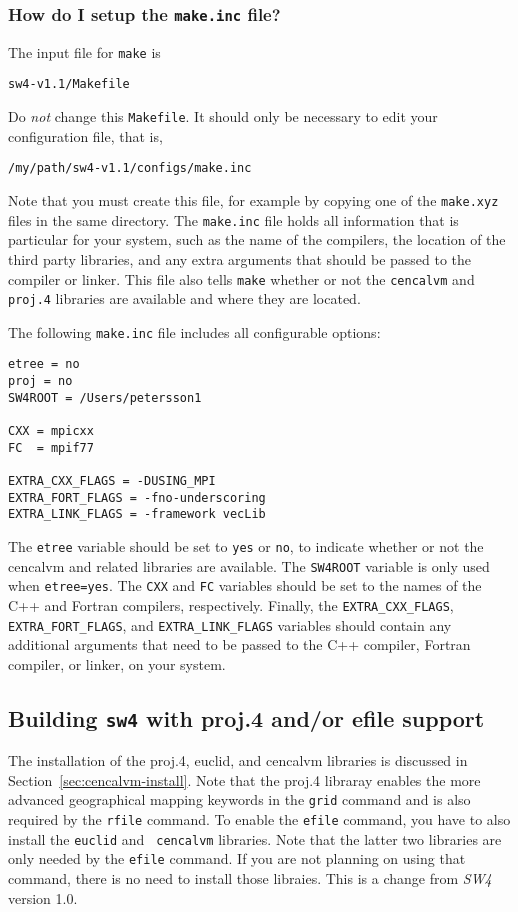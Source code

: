 \documentclass[11pt]{article}
\begin{document}
\subsubsection{How do I setup the {\tt make.inc} file?}

The input file for \verb+make+ is
\begin{verbatim}
sw4-v1.1/Makefile
\end{verbatim}
Do {\em not} change this \verb+Makefile+. It should only be necessary to edit your configuration
file, that is,
\begin{verbatim}
/my/path/sw4-v1.1/configs/make.inc
\end{verbatim}
Note that you must create this file, for example by copying one of the \verb+make.xyz+ files in the
same directory. The \verb+make.inc+ file holds all information that is particular for your system,
such as the name of the compilers, the location of the third party libraries, and any extra
arguments that should be passed to the compiler or linker. This file also tells \verb+make+ whether
or not the \verb+cencalvm+ and \verb+proj.4+ libraries are available and where they are located.

The following \verb+make.inc+ file includes all configurable options:
\begin{verbatim}
etree = no
proj = no
SW4ROOT = /Users/petersson1

CXX = mpicxx
FC  = mpif77

EXTRA_CXX_FLAGS = -DUSING_MPI
EXTRA_FORT_FLAGS = -fno-underscoring
EXTRA_LINK_FLAGS = -framework vecLib
\end{verbatim}
The \verb+etree+ variable should be set to \verb+yes+ or \verb+no+, to indicate whether or not the
cencalvm and related libraries are available. The \verb+SW4ROOT+ variable is only used when
\verb+etree=yes+. The \verb+CXX+ and \verb+FC+ variables should be set to the names of the C++ and
Fortran compilers, respectively. Finally, the \verb+EXTRA_CXX_FLAGS+, \verb+EXTRA_FORT_FLAGS+, and
\verb+EXTRA_LINK_FLAGS+ variables should contain any additional arguments that need to be passed to
the C++ compiler, Fortran compiler, or linker, on your system.

\subsection{Building {\tt sw4} with proj.4 and/or efile support}
The installation of the proj.4, euclid, and cencalvm libraries is discussed in
Section~\ref{sec:cencalvm-install}. Note that the proj.4 libraray enables the more advanced
geographical mapping keywords in the {\tt grid} command and is also required by the {\tt rfile}
command. To enable the {\tt efile} command, you have to also install the {\tt euclid} and {\tt
  cencalvm} libraries. Note that the latter two libraries are only needed by the {\tt efile}
command. If you are not planning on using that command, there is no need to install those
libraies. This is a change from \emph{SW4} version 1.0.
\end{document}

